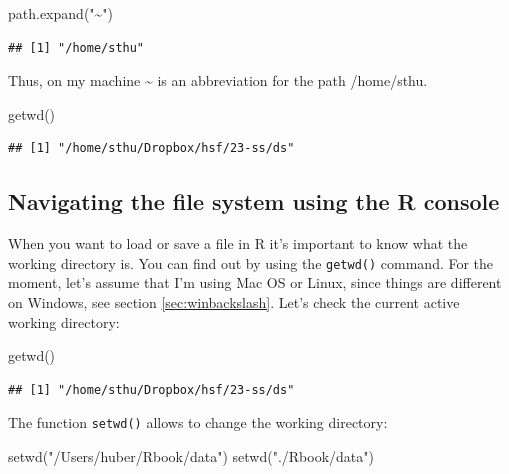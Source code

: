\documentclass[
  12pt,
  oneside]{book}
\newenvironment{Shaded}{\begin{snugshade}}{\end{snugshade}}
\newcommand{\FunctionTok}[1]{\textcolor[rgb]{0.00,0.00,0.00}{#1}}
\newcommand{\NormalTok}[1]{#1}
\newcommand{\StringTok}[1]{\textcolor[rgb]{0.31,0.60,0.02}{#1}}
\theoremstyle{definition}
\theoremstyle{definition}
\theoremstyle{definition}
\theoremstyle{definition}
\theoremstyle{remark}
\begin{document}
\begin{Shaded}
\begin{Highlighting}[]
\FunctionTok{path.expand}\NormalTok{(}\StringTok{"\textasciitilde{}"}\NormalTok{)}
\end{Highlighting}
\end{Shaded}

\begin{verbatim}
## [1] "/home/sthu"
\end{verbatim}

Thus, on my machine \textasciitilde{} is an abbreviation for the path /home/sthu.

\begin{Shaded}
\begin{Highlighting}[]
\FunctionTok{getwd}\NormalTok{()}
\end{Highlighting}
\end{Shaded}

\begin{verbatim}
## [1] "/home/sthu/Dropbox/hsf/23-ss/ds"
\end{verbatim}

\hypertarget{sec:navigationR}{%
\subsection{Navigating the file system using the R console}\label{sec:navigationR}}

When you want to load or save a file in R it's important to know what the working directory is. You can find out by using the \texttt{getwd()} command. For the moment, let's assume that I'm using Mac OS or Linux, since things are different on Windows, see section \ref{sec:winbackslash}.
Let's check the current active working directory:

\begin{Shaded}
\begin{Highlighting}[]
\FunctionTok{getwd}\NormalTok{()}
\end{Highlighting}
\end{Shaded}

\begin{verbatim}
## [1] "/home/sthu/Dropbox/hsf/23-ss/ds"
\end{verbatim}

The function \texttt{setwd()} allows to change the working directory:

\begin{Shaded}
\begin{Highlighting}[]
\FunctionTok{setwd}\NormalTok{(}\StringTok{"/Users/huber/Rbook/data"}\NormalTok{)}
\FunctionTok{setwd}\NormalTok{(}\StringTok{"./Rbook/data"}\NormalTok{)}
\end{Highlighting}
\end{Shaded}
\end{document}
